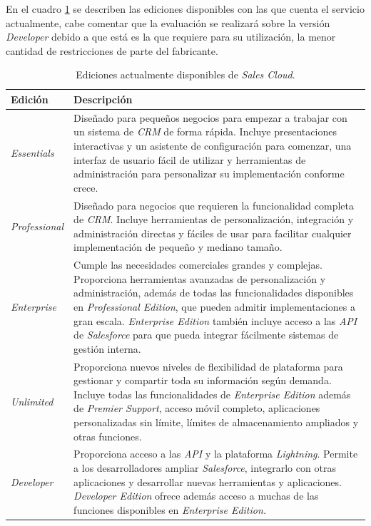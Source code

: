 En el cuadro \ref{ediciones} se describen las ediciones disponibles con las que
cuenta el servicio actualmente, cabe comentar que la evaluación se realizará
sobre la versión \emph{Developer} debido a que está es la que requiere para su
utilización, la menor cantidad de restricciones de parte del fabricante.

\begin{table}
\centering
\begin{tabular}{|l|p{12.0cm}|}
\hline
\footnotesize{\textbf{Edición}} & \footnotesize{\textbf{Descripción}} \\
\hline
\footnotesize{\emph{Essentials}} & \footnotesize{Diseñado para pequeños negocios
para empezar a trabajar con un sistema de \emph{CRM} de forma rápida. Incluye
presentaciones interactivas y un asistente de configuración para comenzar, una
interfaz de usuario fácil de utilizar y herramientas de administración para
personalizar su implementación conforme crece.} \\
\footnotesize{\emph{Professional}} & \footnotesize{Diseñado para negocios que
requieren la funcionalidad completa de \emph{CRM}. Incluye herramientas de
personalización, integración y administración directas y fáciles de usar para
facilitar cualquier implementación de pequeño y mediano tamaño.} \\
\footnotesize{\emph{Enterprise}} & \footnotesize{Cumple las necesidades
comerciales grandes y complejas. Proporciona herramientas avanzadas de
personalización y administración, además de todas las funcionalidades
disponibles en \emph{Professional Edition}, que pueden admitir implementaciones
a gran escala. \emph{Enterprise Edition} también incluye acceso a las \emph{API}
de \emph{Salesforce} para que pueda integrar fácilmente sistemas de gestión
interna.} \\
\footnotesize{\emph{Unlimited}} & \footnotesize{Proporciona nuevos niveles de
flexibilidad de plataforma para gestionar y compartir toda su información según
demanda. Incluye todas las funcionalidades de \emph{Enterprise Edition} además
de \emph{Premier Support}, acceso móvil completo, aplicaciones personalizadas
sin límite, límites de almacenamiento ampliados y otras funciones.} \\
\footnotesize{\emph{Developer}} & \footnotesize{Proporciona acceso a las
\emph{API} y la plataforma \emph{Lightning}. Permite a los desarrolladores
ampliar \emph{Salesforce}, integrarlo con otras aplicaciones y desarrollar
nuevas herramientas y aplicaciones. \emph{Developer Edition} ofrece además
acceso a muchas de las funciones disponibles en \emph{Enterprise Edition.}} \\
\hline
\end{tabular}
\caption{Ediciones actualmente disponibles de \emph{Sales Cloud}.}
\label{ediciones}
\end{table}

